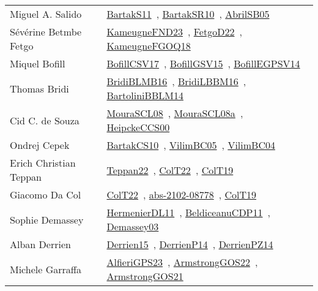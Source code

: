 {\begin{longtable}{p{4cm}p{20cm}}
Miguel A. Salido & \href{works/BartakS11.pdf}{BartakS11}~\cite{BartakS11}, \href{works/BartakSR10.pdf}{BartakSR10}~\cite{BartakSR10}, \href{works/AbrilSB05.pdf}{AbrilSB05}~\cite{AbrilSB05}\\
S{\'{e}}v{\'{e}}rine Betmbe Fetgo & \href{works/KameugneFND23.pdf}{KameugneFND23}~\cite{KameugneFND23}, \href{works/FetgoD22.pdf}{FetgoD22}~\cite{FetgoD22}, \href{works/KameugneFGOQ18.pdf}{KameugneFGOQ18}~\cite{KameugneFGOQ18}\\
Miquel Bofill & \href{works/BofillCSV17.pdf}{BofillCSV17}~\cite{BofillCSV17}, \href{works/BofillGSV15.pdf}{BofillGSV15}~\cite{BofillGSV15}, \href{works/BofillEGPSV14.pdf}{BofillEGPSV14}~\cite{BofillEGPSV14}\\
Thomas Bridi & \href{works/BridiBLMB16.pdf}{BridiBLMB16}~\cite{BridiBLMB16}, \href{works/BridiLBBM16.pdf}{BridiLBBM16}~\cite{BridiLBBM16}, \href{works/BartoliniBBLM14.pdf}{BartoliniBBLM14}~\cite{BartoliniBBLM14}\\
Cid C. de Souza & \href{works/MouraSCL08.pdf}{MouraSCL08}~\cite{MouraSCL08}, \href{works/MouraSCL08a.pdf}{MouraSCL08a}~\cite{MouraSCL08a}, \href{works/HeipckeCCS00.pdf}{HeipckeCCS00}~\cite{HeipckeCCS00}\\
Ondrej Cepek & \href{works/BartakCS10.pdf}{BartakCS10}~\cite{BartakCS10}, \href{works/VilimBC05.pdf}{VilimBC05}~\cite{VilimBC05}, \href{works/VilimBC04.pdf}{VilimBC04}~\cite{VilimBC04}\\
Erich Christian Teppan & \href{works/Teppan22.pdf}{Teppan22}~\cite{Teppan22}, \href{works/ColT22.pdf}{ColT22}~\cite{ColT22}, \href{works/ColT19.pdf}{ColT19}~\cite{ColT19}\\
Giacomo Da Col & \href{works/ColT22.pdf}{ColT22}~\cite{ColT22}, \href{works/abs-2102-08778.pdf}{abs-2102-08778}~\cite{abs-2102-08778}, \href{works/ColT19.pdf}{ColT19}~\cite{ColT19}\\
Sophie Demassey & \href{works/HermenierDL11.pdf}{HermenierDL11}~\cite{HermenierDL11}, \href{works/BeldiceanuCDP11.pdf}{BeldiceanuCDP11}~\cite{BeldiceanuCDP11}, \href{}{Demassey03}~\cite{Demassey03}\\
Alban Derrien & \href{}{Derrien15}~\cite{Derrien15}, \href{works/DerrienP14.pdf}{DerrienP14}~\cite{DerrienP14}, \href{works/DerrienPZ14.pdf}{DerrienPZ14}~\cite{DerrienPZ14}\\
Michele Garraffa & \href{works/AlfieriGPS23.pdf}{AlfieriGPS23}~\cite{AlfieriGPS23}, \href{works/ArmstrongGOS22.pdf}{ArmstrongGOS22}~\cite{ArmstrongGOS22}, \href{works/ArmstrongGOS21.pdf}{ArmstrongGOS21}~\cite{ArmstrongGOS21}\\

\end{longtable}}
